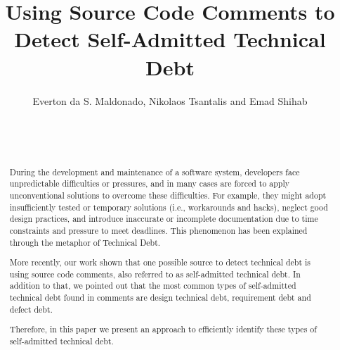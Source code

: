 \documentclass{sig-alternate}
\begin{document}

\title{Using Source Code Comments to Detect Self-Admitted Technical Debt}

\author{
\alignauthor 
       Everton da S. Maldonado, Nikolaos Tsantalis and Emad Shihab\\
       \\
       \\
       \\
}


\maketitle
\begin{abstract}
During the development and maintenance of a software system, developers face unpredictable difficulties or pressures, and in many cases are forced to apply unconventional solutions to overcome these difficulties. For example, they might adopt insufficiently tested or temporary solutions (i.e., workarounds and hacks), neglect good design practices, and introduce inaccurate or incomplete documentation due to time constraints and pressure to meet deadlines. This phenomenon has been explained through the metaphor of Technical Debt. 

More recently, our work shown that one possible source to detect technical debt is using source code comments, also referred to as self-admitted technical debt. In addition to that, we pointed out that the most common types of self-admitted technical debt found in comments are design technical debt, requirement debt and defect debt. 

Therefore, in this paper we present an approach to efficiently identify these types of self-admitted technical debt. 

\end{abstract}
\end{document}
